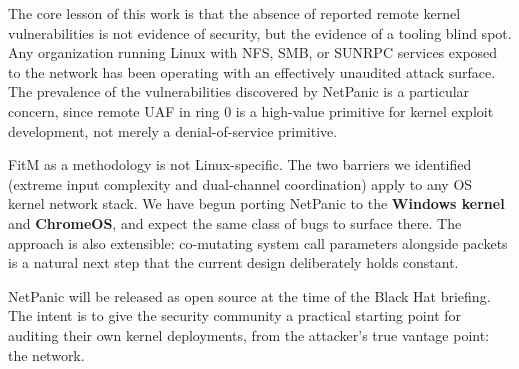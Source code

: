 \documentclass[10pt]{article}
\begin{document}
The core lesson of this work is that the absence of reported remote kernel vulnerabilities is not evidence of security, but the evidence of a tooling blind spot. Any organization running Linux with NFS, SMB, or SUNRPC services exposed to the network has been operating with an effectively unaudited attack surface. The prevalence of the vulnerabilities discovered by NetPanic is a particular concern, since remote UAF in ring 0 is a high-value primitive for kernel exploit development, not merely a denial-of-service primitive.

FitM as a methodology is not Linux-specific. The two barriers we identified (extreme input complexity and dual-channel coordination) apply to any OS kernel network stack. We have begun porting NetPanic to the \textbf{Windows kernel} and \textbf{ChromeOS}, and expect the same class of bugs to surface there. The approach is also extensible: co-mutating system call parameters alongside packets is a natural next step that the current design deliberately holds constant.

NetPanic will be released as open source at the time of the Black Hat briefing. The intent is to give the security community a practical starting point for auditing their own kernel deployments, from the attacker's true vantage point: the network.
\end{document}
